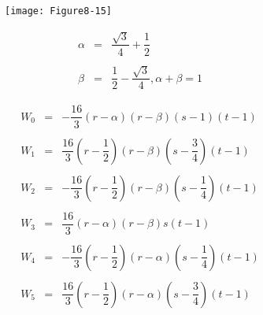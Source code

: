 \begin{description}[leftmargin=0cm,labelindent=0cm]
    \begin{figure}[!htb]
        \centering
        \begin{subfigure}{0.48\linewidth}
            \centering
            \texttt{[image: Figure8-15]}
            \caption*{}
        \end{subfigure}
        \hfill
        \begin{subfigure}{0.48\linewidth}
            \centering
            \begin{equation*}
            \begin{array}{lll}
            \alpha &=& \dfrac{\sqrt{3}}{4} + \dfrac{1}{2} \\ \\
            \beta &=& \dfrac{1}{2} - \dfrac{\sqrt{3}}{4}, \alpha + \beta = 1
            \end{array}
            \end{equation*}
        \end{subfigure}
        \hfill
        \begin{subfigure}{0.48\linewidth}
            \centering
            \begin{equation*}
            \begin{array}{lll}
            W_0 &=&-\dfrac{16}{3}(r - \alpha)(r - \beta)(s - 1)(t - 1) \\ \\
            W_1 &=&\dfrac{16}{3}(r - \dfrac{1}{2})(r - \beta)(s - \dfrac{3}{4})(t - 1) \\ \\
            W_2 &=& -\dfrac{16}{3}(r - \dfrac{1}{2})(r - \beta)(s - \dfrac{1}{4})(t - 1) \\ \\
            W_3 &=& \dfrac{16}{3}(r - \alpha)(r - \beta)s(t - 1) \\ \\
            W_4 &=& -\dfrac{16}{3}(r - \dfrac{1}{2})(r - \alpha)(s - \dfrac{1}{4})(t - 1) \\ \\
            W_5 &=& \dfrac{16}{3}(r - \dfrac{1}{2})(r - \alpha)(s - \dfrac{3}{4})(t - 1)
            \end{array}
            \end{equation*}
        \end{subfigure}%
        \hfill
        \begin{subfigure}{0.48\linewidth}
            \centering
            \begin{equation*}
            \begin{array}{lll}

\end{array}
\end{equation*}
\end{subfigure}
\end{figure}
\end{description}
